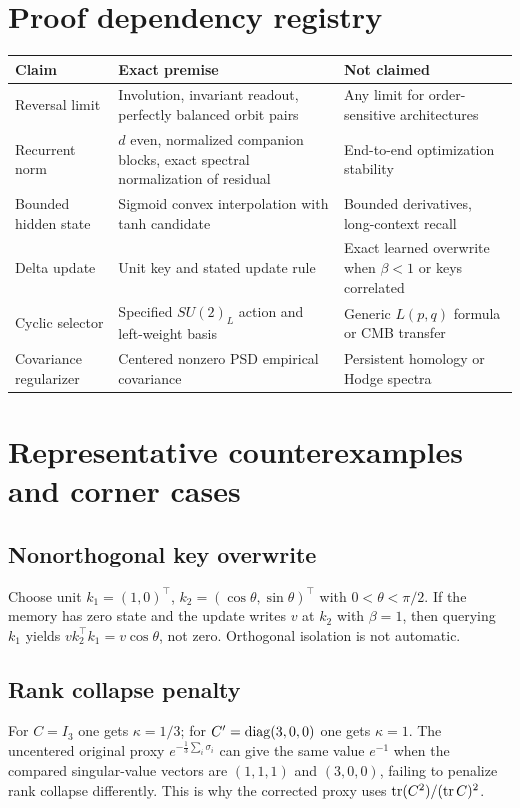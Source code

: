 \documentclass[11pt,a4paper]{article}
\theoremstyle{plain}\newtheorem{theorem}{Theorem}[section]\newtheorem{proposition}[theorem]{Proposition}\newtheorem{lemma}[theorem]{Lemma}
\theoremstyle{definition}\newtheorem{definition}[theorem]{Definition}\newtheorem{remark}[theorem]{Remark}\newtheorem{counterexample}[theorem]{Counterexample}
\begin{document}
\section{Proof dependency registry}
\begin{longtable}{@{}p{.22\linewidth}p{.35\linewidth}p{.34\linewidth}@{}}\toprule
Claim & Exact premise & Not claimed\\\midrule\endhead
Reversal limit & Involution, invariant readout, perfectly balanced orbit pairs & Any limit for order-sensitive architectures\\
Recurrent norm & $d$ even, normalized companion blocks, exact spectral normalization of residual & End-to-end optimization stability\\
Bounded hidden state & Sigmoid convex interpolation with tanh candidate & Bounded derivatives, long-context recall\\
Delta update & Unit key and stated update rule & Exact learned overwrite when $\beta<1$ or keys correlated\\
Cyclic selector & Specified $SU(2)_L$ action and left-weight basis & Generic $L(p,q)$ formula or CMB transfer\\
Covariance regularizer & Centered nonzero PSD empirical covariance & Persistent homology or Hodge spectra\\\bottomrule
\end{longtable}

\section{Representative counterexamples and corner cases}
\subsection{Nonorthogonal key overwrite}
Choose unit $k_1=(1,0)^\top$, $k_2=(\cos\theta,\sin\theta)^\top$ with $0<\theta<\pi/2$. If the memory has zero state and the update writes $v$ at $k_2$ with $\beta=1$, then querying $k_1$ yields $vk_2^\top k_1=v\cos\theta$, not zero. Orthogonal isolation is not automatic.
\subsection{Rank collapse penalty}
For $C=I_3$ one gets $\kappa=1/3$; for $C'=\operatorname{diag}(3,0,0)$ one gets $\kappa=1$. The uncentered original proxy $e^{-\frac13\sum_i\sigma_i}$ can give the same value $e^{-1}$ when the compared singular-value vectors are $(1,1,1)$ and $(3,0,0)$, failing to penalize rank collapse differently. This is why the corrected proxy uses $\operatorname{tr}(C^2)/(\operatorname{tr} C)^2$.
\end{document}
